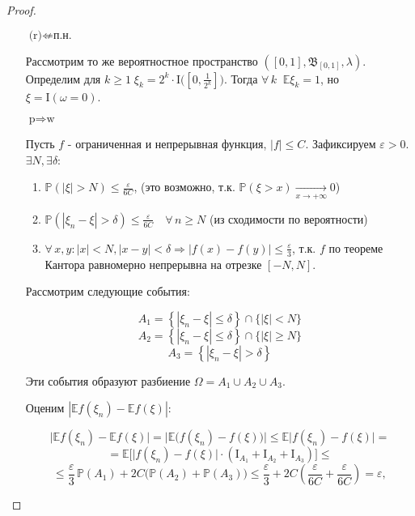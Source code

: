 \begin{proof}
\begin{itemize}
    \item[$\text{(r)} \nLeftarrow \text{п.н.}$]
    
        Рассмотрим то же вероятностное пространство $([0, 1], \mathfrak{B}_{[0, 1]}, \lambda)$.
        Определим для $k \geqslant 1 \; \xi_k = 2^{k} \cdot \mathrm{I}\bigl(\left[0, \frac{1}{2^{k}}\right]\bigr).$ 
        Тогда $\forall \, k \;\; \mathbb{E}\xi_k = 1$, но $\xi = \mathrm{I}(\omega = 0)$.
    
    \item[$\text{p} \Rightarrow \text{w}$]
    
        Пусть $f$ - ограниченная и непрерывная функция, $|f| \leqslant C$. 
        Зафиксируем $\varepsilon > 0$. 
        $\exists N, \exists \delta$:
    
        \begin{enumerate}
            \item $\mathbb{P}(|\xi| > N) \leqslant \frac{\varepsilon}{6C}$, (это возможно, т.к. $\mathbb{P}(\xi > x) \xrightarrow[x \to +\infty]{} 0$)
            \item $\mathbb{P}(|\xi_n - \xi| > \delta) \leqslant \frac{\varepsilon}{6C} \quad \forall \, n \geqslant N$ (из сходимости по вероятности)
            \item $\forall \, x,y \colon |x| < N, |x - y| < \delta \Rightarrow |f(x) - f(y)| \leqslant \frac{\varepsilon}{3}$, т.к. $f$ по теореме Кантора равномерно непрерывна на отрезке $[-N, N]$.
        \end{enumerate}
        
        Рассмотрим следующие события:
        
        $$ A_{1}=\left\{\left|\xi_{n}-\xi\right| \leqslant \delta\right\} \cap\{|\xi|<N\} $$
        $$ A_{2}=\left\{\left|\xi_{n}-\xi\right| \leqslant \delta\right\} \cap\{|\xi| \geqslant N\} $$
        $$ A_{3}=\left\{\left|\xi_{n}-\xi\right|>\delta\right\} $$
        
        Эти события образуют разбиение $\Omega=A_{1} \cup A_{2} \cup A_{3} $. 
        
        Оценим $|\mathbb{E}f(\xi_n) - \mathbb{E}f(\xi)|$:
        
        $$\bigl| \mathbb{E} f\left(\xi_{n}\right)-\mathbb{E} f(\xi) \bigr|=
        \bigl| \mathbb{E} \bigl( f\left(\xi_{n}\right)-f(\xi) \bigr) \bigr|\leqslant 
        \mathbb{E} \bigl| f\left(\xi_{n}\right)-f(\xi) \bigr| = $$
        $$ = \mathbb{E} \biggl[ \bigl| f\left(\xi_{n}\right)-f(\xi)\bigr| \cdot \left(\mathrm{I}_{A_{1}}+\mathrm{I}_{A_{2}}+\mathrm{I}_{A_{3}}\right) \biggr]\leq$$
        $$\leqslant \frac{\varepsilon}{3} \, \mathbb{P}\left(A_{1}\right)+2 C\bigl(\mathbb{P}\left(A_{2}\right) + \mathbb{P}\left(A_{3}\right)\bigr) \leqslant 
        \frac{\varepsilon}{3}+2 C\left(\frac{\varepsilon}{6 C}+\frac{\varepsilon}{6 C}\right)=\varepsilon,$$
        

\end{itemize}
\end{proof}
